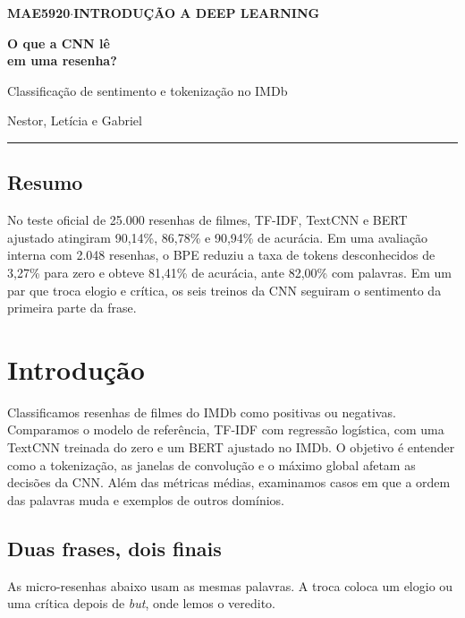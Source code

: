 \thispagestyle{empty}
\vspace*{3mm}
{\sffamily\bfseries\color{Teal} MAE5920\enspace $\cdot$\enspace INTRODUÇÃO A DEEP LEARNING\par}
\vspace{4mm}
{\fontsize{39}{41}\selectfont\sffamily\bfseries O que a CNN lê\\ em uma resenha?\par}
\vspace{3mm}
{\large Classificação de sentimento e tokenização no IMDb\par}
\vspace{3mm}
{\sffamily Nestor, Letícia e Gabriel\par}
\vspace{4mm}
{\color{Rule}\rule{\linewidth}{.7pt}}\par

\subsection*{Resumo}
No teste oficial de 25.000 resenhas de filmes, TF-IDF, TextCNN e BERT
ajustado atingiram 90,14\%, 86,78\% e 90,94\% de acurácia. Em uma avaliação
interna com 2.048 resenhas, o BPE reduziu a taxa de tokens desconhecidos de
3,27\% para zero e obteve 81,41\% de acurácia, ante 82,00\% com palavras.
Em um par que troca elogio e crítica, os seis treinos da CNN seguiram o
sentimento da primeira parte da frase.

\section{Introdução}
\label{sec:ordem}
Classificamos resenhas de filmes do IMDb como positivas ou negativas.
Comparamos o modelo de referência, TF-IDF com regressão logística, com uma
TextCNN treinada do zero e um BERT ajustado no IMDb. O objetivo é entender
como a tokenização, as janelas de convolução e o máximo global afetam as
decisões da CNN. Além das métricas médias, examinamos casos em que a ordem
das palavras muda e exemplos de outros domínios.

\subsection{Duas frases, dois finais}
As micro-resenhas abaixo usam as mesmas palavras. A troca coloca um elogio
ou uma crítica depois de \textit{but}, onde lemos o veredito.

\medskip
\FrasesContraste
\medskip

